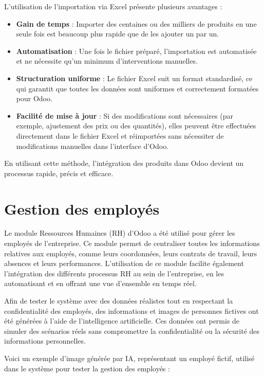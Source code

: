 \documentclass[12pt]{report}
\begin{document}
L'utilisation de l'importation via Excel présente plusieurs avantages :
\begin{itemize}
    \item \textbf{Gain de temps} : Importer des centaines ou des milliers de produits en une seule fois est beaucoup plus rapide que de les ajouter un par un.
    \item \textbf{Automatisation} : Une fois le fichier préparé, l'importation est automatisée et ne nécessite qu'un minimum d'interventions manuelles.
    \item \textbf{Structuration uniforme} : Le fichier Excel suit un format standardisé, ce qui garantit que toutes les données sont uniformes et correctement formatées pour Odoo.
    \item \textbf{Facilité de mise à jour} : Si des modifications sont nécessaires (par exemple, ajustement des prix ou des quantités), elles peuvent être effectuées directement dans le fichier Excel et réimportées sans nécessiter de modifications manuelles dans l'interface d'Odoo.
\end{itemize}

En utilisant cette méthode, l'intégration des produits dans Odoo devient un processus rapide, précis et efficace.


\section{Gestion des employés}

Le module Ressources Humaines (RH) d’Odoo a été utilisé pour gérer les employés de l'entreprise. Ce module permet de centraliser toutes les informations relatives aux employés, comme leurs coordonnées, leurs contrats de travail, leurs absences et leurs performances. L'utilisation de ce module facilite également l'intégration des différents processus RH au sein de l'entreprise, en les automatisant et en offrant une vue d'ensemble en temps réel.

Afin de tester le système avec des données réalistes tout en respectant la confidentialité des employés, des informations et images de personnes fictives ont été générées à l’aide de l’intelligence artificielle. Ces données ont permis de simuler des scénarios réels sans compromettre la confidentialité ou la sécurité des informations personnelles.

Voici un exemple d’image générée par IA, représentant un employé fictif, utilisé dans le système pour tester la gestion des employés :
\end{document}
